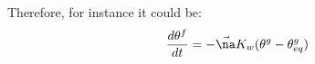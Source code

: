 Therefore, for instance it could be:
\begin{equation}
\frac{d \theta^f}{dt} = - \vec{\na} K_w ({\theta^g - \theta^g_{eq}})
\end{equation}